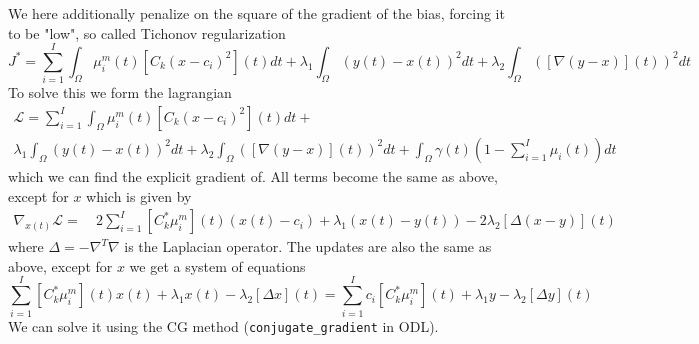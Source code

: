 \documentclass{llncs}
\begin{document}
We here additionally penalize on the square of the gradient of the bias, forcing it to be "low", so called Tichonov regularization
\begin{equation}
J^* = \sum_{i=1}^{I} \int_\Omega {\mu_{i}^m}(t) [C_k (x - c_i)^2](t) dt 
+ 
\lambda_1 \int_\Omega (y(t) - x(t))^2 dt
+
\lambda_2 \int_\Omega ([\nabla (y - x)](t))^2 dt
\end{equation}
To solve this we form the lagrangian
\begin{multline}
\mathcal{L} =
\sum_{i=1}^{I} \int_\Omega {\mu_{i}^m}(t) [C_k (x - c_i)^2](t) dt
+\\
\lambda_1 \int_\Omega (y(t) - x(t))^2 dt
+
\lambda_2 \int_\Omega ([\nabla (y - x)](t))^2 dt
+
\int_\Omega \gamma(t) \left(1 - \sum_{i=1}^{I} \mu_i(t)\right) dt
\end{multline}
which we can find the explicit gradient of. 
All terms become the same as above, except for $x$ which is given by
\begin{align*}
\nabla_{x(t)} \mathcal{L}
=&\
2 \sum_{i=1}^{I} [C_k^* \mu_{i}^m](t) (x(t) - c_i) + \lambda_1 (x(t) - y(t)) - 2 \lambda_2 [\Delta (x - y)](t)
\end{align*}
where $\Delta = -\nabla^T \nabla$ is the Laplacian operator.
The updates are also the same as above, except for $x$ we get a system of equations
\begin{equation}
\sum_{i=1}^{I} [C_k^* \mu_{i}^m](t) x(t) + \lambda_1 x(t) - \lambda_2 [\Delta x](t)
=
\sum_{i=1}^{I} c_i [C_k^* \mu_{i}^m](t) + \lambda_1 y - \lambda_2 [\Delta y](t)
\end{equation}
We can solve it using the CG method (\texttt{conjugate\_gradient} in ODL).
\end{document}
